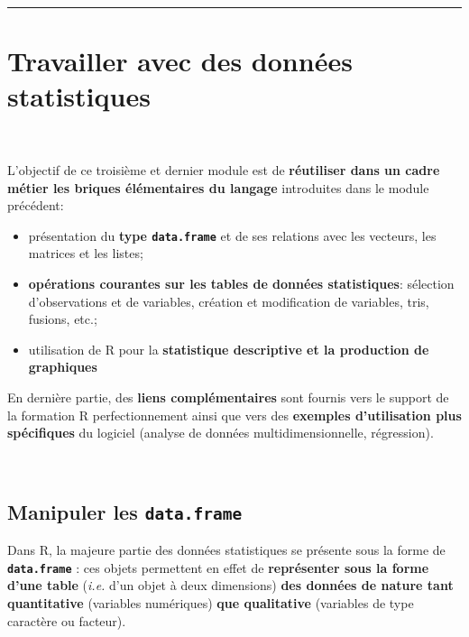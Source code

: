 \documentclass[12pt,twosided, notitlepage]{book}
\providecommand{\tightlist}{%
  \setlength{\itemsep}{0pt}\setlength{\parskip}{0pt}}
\begin{document}
\begin{center} \rule{0.5\linewidth}{\linethickness}\end{center}

\bigskip  \fi 


\chapter{Travailler avec des données statistiques}

\minitoc 

~

L'objectif de ce troisième et dernier module est de \textbf{réutiliser
dans un cadre \og métier \fg{} les briques élémentaires du langage}
introduites dans le module précédent:

\begin{itemize}
\tightlist
\item
  présentation du \textbf{type \texttt{data.frame}} et de ses relations
  avec les vecteurs, les matrices et les listes;
\item
  \textbf{opérations courantes sur les tables de données statistiques}:
  sélection d'observations et de variables, création et modification de
  variables, tris, fusions, etc.;
\item
  utilisation de R pour la \textbf{statistique descriptive et la
  production de graphiques}
\end{itemize}

En dernière partie, des \textbf{liens complémentaires} sont fournis vers
le support de la formation R perfectionnement ainsi que vers des
\textbf{exemples d'utilisation plus spécifiques} du logiciel (analyse de
données multidimensionnelle, régression).

~

\section{\texorpdfstring{Manipuler les
\texttt{data.frame}}{Manipuler les data.frame}}\label{manipuler-les-data.frame}

Dans R, la majeure partie des données statistiques se présente sous la
forme de \textbf{\texttt{data.frame}} : ces objets permettent en effet
de \textbf{représenter sous la forme d'une table} (\emph{i.e.} d'un
objet à deux dimensions) \textbf{des données de nature tant
quantitative} (variables numériques) \textbf{que qualitative} (variables
de type caractère ou facteur).
\end{document}

